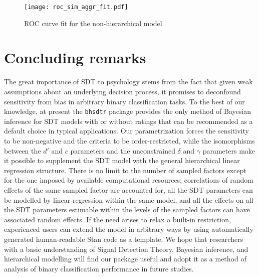 \documentclass[a4paper,man,apacite,floatsintext]{apa6}
\newcommand{\code}[1]{\texttt{#1}}
\begin{document}
\begin{figure}[H]
  \centering
  \texttt{[image: roc\_sim\_aggr\_fit.pdf]}
  \caption{ROC curve fit for the non-hierarchical model}
  \label{fig:8}
\end{figure}

\section{Concluding remarks}

The great importance of SDT to psychology stems from the fact that
given weak assumptions about an underlying decision process, it
promises to deconfound sensitivity from bias in arbitrary binary
classification tasks. To the best of our knowledge, at present the
\code{bhsdtr} package provides the only method of Bayesian inference
for SDT models with or without ratings that can be recommended as a
default choice in typical applications. Our parametrization forces the
sensitivity to be non-negative and the criteria to be
order-restricted, while the isomorphisms between the $d'$ and $c$
parameters and the unconstrained $\delta$ and $\gamma$ parameters make
it possible to supplement the SDT model with the general hierarchical
linear regression structure. There is no limit to the number of
sampled factors except for the one imposed by available computational
resources; correlations of random effects of the same sampled factor
are accounted for, all the SDT parameters can be modelled by linear
regression within the same model, and all the effects on all the SDT
parameters estimable within the levels of the sampled factors can have
associated random effects. If the need arises to relax a built-in
restriction, experienced users can extend the model in arbitrary ways
by using automatically generated human-readable Stan code as a
template. We hope that researchers with a basic understanding of
Signal Detection Theory, Bayesian inference, and hierarchical
modelling will find our package useful and adopt it as a method of
analysis of binary classification performance in future studies.


\end{document}
